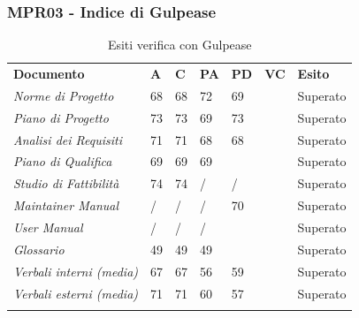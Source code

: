 \subsubsection{MPR03 - Indice di Gulpease}
\begin{center}
    \centering
    \renewcommand{\arraystretch}{1.8}
    \label{tab:IndiciGulpease}
    \begin{longtable}[!h]{p{100px} p{50px} p{50px} p{50px} p{50px} p{50px} p{50px}}
        \caption{Esiti verifica con Gulpease}                                                                                        \\
        \rowcolor{logo!70}   \textbf{Documento} & \textbf{A} & \textbf{C} & \textbf{PA} & \textbf{PD} & \textbf{VC} & \textbf{Esito} \\
        \textit{Norme di Progetto}              & 68         & 68         & 72          & 69          &             & Superato       \\
        \textit{Piano di Progetto}              & 73         & 73         & 69          & 73          &             & Superato       \\
        \textit{Analisi dei Requisiti}          & 71         & 71         & 68          & 68          &             & Superato       \\
        \textit{Piano di Qualifica}             & 69         & 69         & 69          &             &             & Superato       \\
        \textit{Studio di Fattibilità}          & 74         & 74         & /           & /           &             & Superato       \\
        \textit{Maintainer Manual}              & /          & /          & /           & 70          &             & Superato       \\
        \textit{User Manual}                    & /          & /          & /           &             &             & Superato       \\
        \textit{Glossario}                      & 49         & 49         & 49          &             &             & Superato       \\
        \textit{Verbali interni (media)}        & 67         & 67         & 56          & 59          &             & Superato       \\
        \textit{Verbali esterni (media)}        & 71         & 71         & 60          & 57          &             & Superato       \\
        \rowcolor{white}
    \end{longtable}
\end{center}
